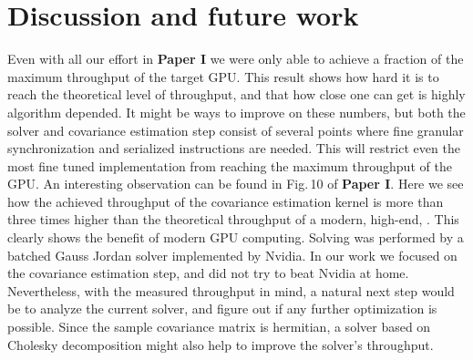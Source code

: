 \section{Discussion and future work}
Even with all our effort in \textbf{Paper I} we were only able to achieve a fraction of the maximum throughput of the target GPU. This result shows how hard it is to reach the theoretical level of throughput, and that how close one can get is highly algorithm depended. It might be ways to improve on these numbers, but both the solver and covariance estimation step consist of several points where fine granular synchronization and serialized instructions are needed. This will restrict even the most fine tuned implementation from reaching the maximum throughput of the GPU. An interesting observation can be found in Fig.\,10 of \textbf{Paper I}. Here we see how the achieved throughput of the covariance estimation kernel is more than three times higher than the theoretical throughput of a modern, high-end, . This clearly shows the benefit of modern GPU computing.  Solving was performed by a batched Gauss Jordan solver implemented by Nvidia. In our work we focused on the covariance estimation step, and did not try to beat Nvidia at home. Nevertheless, with the measured throughput in mind, a natural next step would be to analyze the current solver, and figure out if any further optimization is possible. Since the sample covariance matrix is hermitian, a solver based on Cholesky decomposition might also help to improve the solver's throughput.
\\\\

